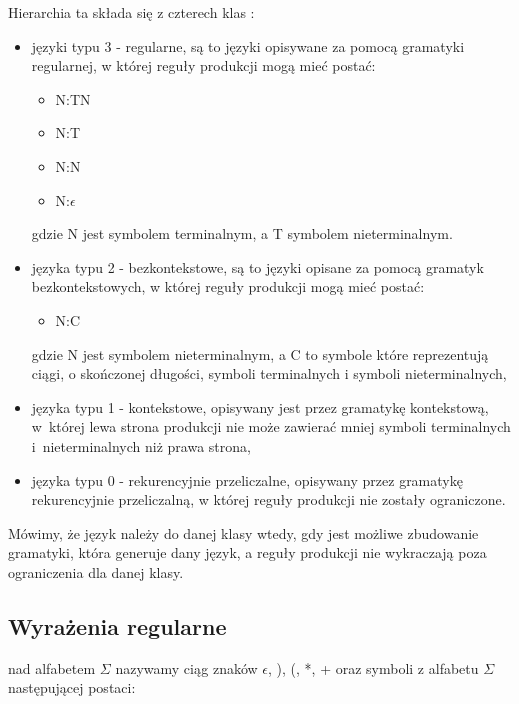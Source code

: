 Hierarchia ta składa się z czterech klas \cite{aho, link_eng_chomsky, link_pl_chomsky}:
\begin{itemize}
 \item języki typu 3 - regularne,
   są to języki opisywane za pomocą gramatyki regularnej,
   w której reguły produkcji mogą mieć postać:
      \begin{itemize}
        \item   N:TN
        \item   N:T
        \item   N:N
        \item   N:$\epsilon$
      \end{itemize}
  gdzie N jest symbolem terminalnym, a T symbolem nieterminalnym.

 \item języka typu 2 - bezkontekstowe,
    są to języki opisane za pomocą gramatyk bezkontekstowych,
    w której reguły produkcji mogą mieć postać:
      \begin{itemize}
	\item N:C
      \end{itemize}
    gdzie N jest symbolem nieterminalnym,
    a C to symbole które reprezentują ciągi,
    o skończonej długości,
    symboli terminalnych i symboli nieterminalnych,	  
			   
\item języka typu 1 - kontekstowe,
   opisywany jest przez gramatykę kontekstową, w~której lewa strona produkcji nie może
   zawierać mniej symboli terminalnych i~nieterminalnych niż prawa strona,

\item języka typu 0 - rekurencyjnie przeliczalne,
  opisywany przez gramatykę rekurencyjnie przeliczalną,
  w której reguły produkcji nie zostały ograniczone. 
  
\end{itemize}
 
Mówimy, że język należy do danej klasy wtedy,
 gdy jest możliwe zbudowanie gramatyki,
 która generuje dany język,
 a reguły produkcji nie wykraczają poza ograniczenia dla danej klasy.

\subsection{Wyrażenia regularne}

 nad alfabetem $\Sigma$ nazywamy ciąg znaków  $\epsilon$, ), (, *, + oraz symboli z alfabetu $\Sigma$ następującej postaci:

